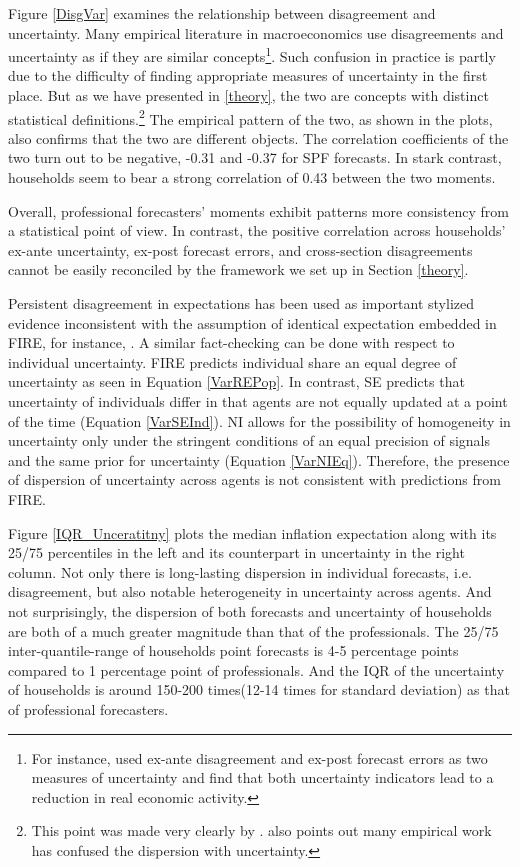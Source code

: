 \documentclass[12pt]{article}
\begin{document}
	Figure \ref{DisgVar} examines the relationship between disagreement and uncertainty. Many empirical literature in macroeconomics use disagreements and uncertainty as if they are similar concepts\footnote{For instance, \citet{bachmann2013uncertainty} used ex-ante disagreement and ex-post forecast errors as two measures of uncertainty and find that both uncertainty indicators lead to a reduction in real economic activity.}. Such confusion in practice is partly due to the difficulty of finding appropriate measures of uncertainty in the first place. But as we have presented in \ref{theory}, the two are concepts with distinct statistical definitions.\footnote {This point was made very clearly by \citet{zarnowitz1987consensus}.  \citet{manski2018survey} also points out many empirical work has confused the dispersion with uncertainty.} The empirical pattern of the two,  as shown in the plots, also confirms that the two are different objects. The correlation coefficients of the two turn out to be negative, -0.31 and -0.37 for SPF forecasts. In stark contrast, households seem to bear a strong correlation of 0.43 between the two moments.  
	
	Overall, professional forecasters' moments exhibit patterns more consistency from a statistical point of view.  In contrast, the positive correlation across households' ex-ante uncertainty, ex-post forecast errors, and cross-section disagreements cannot be easily reconciled by the framework we set up in Section \ref{theory}. 
	
	Persistent disagreement in expectations has been used as important stylized evidence inconsistent with the assumption of identical expectation embedded in FIRE, for instance, \citet{mankiw2003disagreement}. A similar fact-checking can be done with respect to individual uncertainty. FIRE predicts individual share an equal degree of uncertainty as  seen in Equation \ref{VarREPop}. In contrast, SE predicts that uncertainty of individuals differ in that agents are not equally updated at a point of the time (Equation \ref{VarSEInd}). NI allows for the possibility of homogeneity in uncertainty only under the stringent conditions of an equal precision of signals and the same prior for uncertainty (Equation \ref{VarNIEq}). Therefore, the presence of dispersion of uncertainty across agents is not consistent with predictions from FIRE.
	
	Figure \ref{IQR_Unceratitny} plots the median inflation expectation along with its 25/75 percentiles in the left and its counterpart in uncertainty in the right column.  Not only there is long-lasting dispersion in individual forecasts, i.e. disagreement, but also notable heterogeneity in uncertainty across agents.  And not surprisingly, the dispersion of both forecasts and uncertainty of households are both of a much greater magnitude than that of the professionals. The 25/75 inter-quantile-range of households point forecasts is 4-5 percentage points compared to 1 percentage point of professionals. And the IQR of the uncertainty of households is around 150-200 times(12-14 times for standard deviation) as that of professional forecasters.  
	
\end{document}
